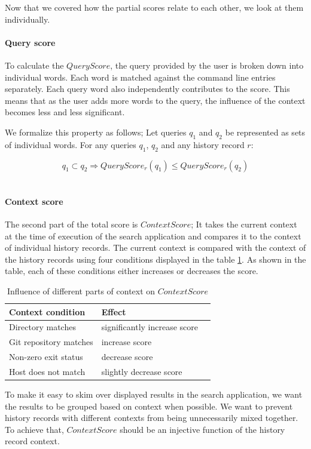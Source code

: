 Now that we covered how the partial scores relate to each other, we look at them individually.

\paragraph{Query score}

To calculate the \(QueryScore\), the query provided by the user is broken down into individual words. 
Each word is matched against the command line entries separately. Each query word also independently contributes to the score. This means that as the user adds more words to the query, the influence of the context becomes less and less significant.

We formalize this property as follows; Let queries \(q_1\) and \(q_2\) be represented as sets of individual words. For any queries \(q_1\), \(q_2\) and any history record \(r\): 

\[ q_1 \subset q_2 \Rightarrow QueryScore_r(q_1) \leq QueryScore_r(q_2)\]\

\paragraph{Context score}
The second part of the total score is \(ContextScore\); It takes the current context at the time of execution of the search application and compares it to the context of individual history records. 
The current context is compared with the context of the history records using four conditions displayed in the table \ref{tab:score-matching-context}. As shown in the table, each of these conditions either increases or decreases the score.

\begin{table}[h]
\centering
\begin{tabular}{lll}
\hline \hline
Context condition & Effect \\
\hline
Directory matches & significantly increase score \\ 
Git repository matches & increase score \\ 
Non-zero exit status & decrease score \\
Host does not match & slightly decrease score \\ 
\hline \hline
\end{tabular}
\caption{Influence of different parts of context on \(ContextScore\)}
\label{tab:score-matching-context}
\end{table}

To make it easy to skim over displayed results in the search application, we want the results to be grouped based on context when possible. 
We want to prevent history records with different contexts from being unnecessarily mixed together. 
To achieve that, \(ContextScore\) should be an injective function of the history record context.

